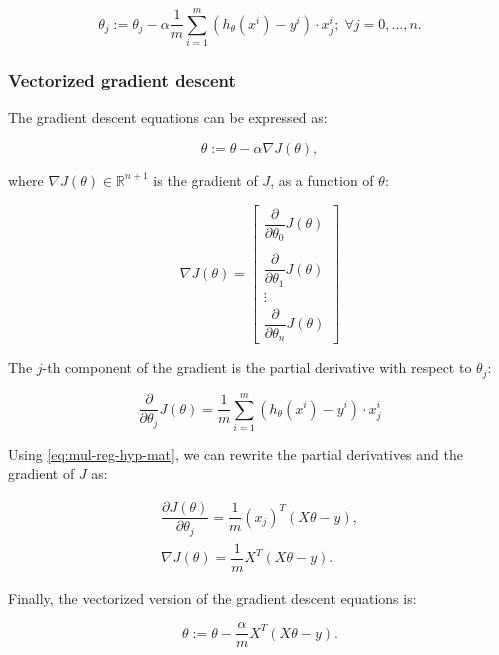 \documentclass[a4paper,11pt]{report}
\begin{document}
\begin{equation}\label{eq:mul-reg-gdexp}
\theta_j := \theta_j - \alpha \frac{1}{m} \sum\limits_{i=1}^{m} (h_\theta(x^{i}) - y^{i}) \cdot x_j^{i}; \; \forall j = 0, \ldots, n.
\end{equation}

\subsubsection*{Vectorized gradient descent}

The gradient descent equations can be expressed as:

$$ \theta := \theta - \alpha \nabla J(\theta), $$

where $\nabla J(\theta) \in \mathbb{R}^{n+1}$ is  the gradient of $J$, as a function of $\theta$:

$$\nabla J(\theta)  = \begin{bmatrix}
                        \dfrac{\partial}{\partial \theta_0}{J(\theta)}   \\\\
                        \dfrac{\partial}{\partial \theta_1}{J(\theta)}   \\
                        \vdots \\
                        \dfrac{\partial}{\partial \theta_n}{J(\theta)}
                      \end{bmatrix}$$

The $j$-th component of the gradient is the partial derivative with respect to $\theta_j$:

$$ \dfrac{\partial}{\partial \theta_j}J(\theta) = \dfrac{1}{m} \sum\limits_{i=1}^{m}  \left(h_\theta(x^{i}) - y^{i} \right) \cdot x_j^{i} $$

Using \eqref{eq:mul-reg-hyp-mat}, we can  rewrite the partial derivatives and the gradient of $J$ as:

\begin{equation*}
\begin{split}
\dfrac{\partial J(\theta)}{\partial \theta_j} = \dfrac{1}{m} (x_j)^{T} (X\theta - {y}), \\
\nabla J(\theta) = \dfrac{1}{m} X^{T} (X\theta - {y}).
\end{split}
\end{equation*}

Finally, the vectorized version of the gradient descent equations is:

\begin{equation}\label{eq:mul-reg-gdvect}
\theta := \theta - \frac{\alpha}{m} X^{T} (X\theta - {y}).
\end{equation}
\end{document}
